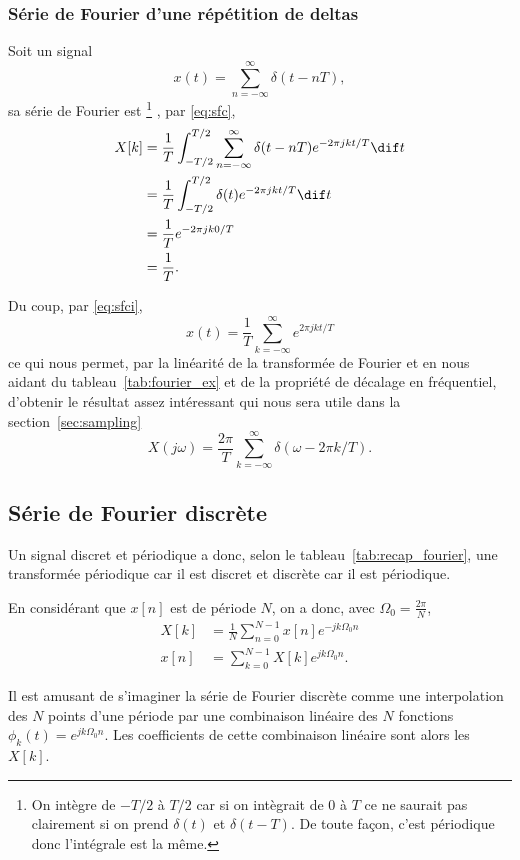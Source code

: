 \subsubsection{Série de Fourier d'une répétition de deltas}
\label{sec:deltas}
Soit un signal
\[ x(t) = \sum_{n=-\infty}^\infty \delta(t-nT), \]
sa série de Fourier est
\footnote{On intègre de $-T/2$ à $T/2$ car si on intègrait
de $0$ à $T$ ce ne saurait pas clairement si on prend $\delta(t)$ et
$\delta(t-T)$.
De toute façon, c'est périodique donc l'intégrale est la même.}
, par \eqref{eq:sfc},
\begin{align*}
  X[k] & = \frac{1}{T}\int_{-T/2}^{T/2} \sum_{n=-\infty}^\infty \delta(t-nT)
  e^{-2\pi jkt/T} \dif t\\
  & = \frac{1}{T}\int_{-T/2}^{T/2} \delta(t) e^{-2\pi jkt/T} \dif t\\
  & = \frac{1}{T} e^{-2\pi jk0/T}\\
  & = \frac{1}{T}.\\
\end{align*}

Du coup, par \eqref{eq:sfci},
\[ x(t) = \frac{1}{T}\sum_{k=-\infty}^\infty e^{2\pi jkt/T} \]
ce qui nous permet,
par la linéarité de la transformée de Fourier et en nous aidant du
tableau~\ref{tab:fourier_ex} et de la propriété de décalage en fréquentiel,
d'obtenir le résultat assez intéressant
qui nous sera utile dans la section~\ref{sec:sampling}
\[ X(j\omega) = \frac{2\pi}{T}
\sum_{k=-\infty}^\infty \delta(\omega-2\pi k/T). \]

\subsection{Série de Fourier discrète}
Un signal discret et périodique a donc,
selon le tableau~\ref{tab:recap_fourier}, une transformée
périodique car il est discret et discrète car il est périodique.

En considérant que $x[n]$ est de période $N$, on a donc,
avec $\Omega_0 = \frac{2\pi}{N}$,
\begin{align}
  \label{eq:sfd}
  X[k] & = \frac{1}{N} \sum_{n=0}^{N-1}x[n]e^{-jk\Omega_0n}\\
  \nonumber
  x[n] & = \sum_{k=0}^{N-1}X[k]e^{jk\Omega_0n}.
\end{align}

Il est amusant de s'imaginer la série de Fourier discrète
comme une interpolation des $N$ points d'une période par
une combinaison linéaire des $N$ fonctions $\phi_k(t) = e^{jk\Omega_0n}$.
Les coefficients de cette combinaison linéaire sont alors les $X[k]$.

